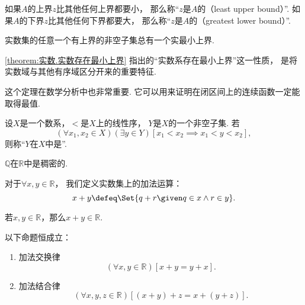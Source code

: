 如果\(A\)的上界\(z\)比其他任何上界都要小，
那么称“\(z\)是\(A\)的（least upper bound）”.
如果\(A\)的下界\(z\)比其他任何下界都要大，
那么称“\(z\)是\(A\)的（greatest lower bound）”.

\begin{theorem}\label{theorem:实数.实数存在最小上界}
实数集的任意一个有上界的非空子集总有一个实最小上界.
\end{theorem}
\cref{theorem:实数.实数存在最小上界}
指出的“实数系存在最小上界”这一性质，
是将实数域与其他有序域区分开来的重要特征.

这个定理在数学分析中也非常重要.
它可以用来证明在闭区间上的连续函数一定能取得最值.

\begin{definition}
设\(X\)是一个数系，\(<\)是\(X\)上的线性序，
\(Y\)是\(X\)的一个非空子集.
若\[
	(\forall x_1,x_2 \in X)
	(\exists y \in Y)
	[x_1 < x_2 \implies x_1 < y < x_2],
\]
则称“\(Y\)在\(X\)中是”.
\end{definition}

\begin{proposition}
\(\mathbb{Q}\)在\(\mathbb{R}\)中是稠密的.
\end{proposition}

\begin{definition}
对于\(\forall x,y\in\mathbb{R}\)，
我们定义实数集上的加法运算：
\begin{equation}
	x + y \defeq \Set{
		q + r \given q \in x \land r \in y
	}.
\end{equation}
\end{definition}

\begin{lemma}
若\(x,y\in\mathbb{R}\)，那么\(x+y\in\mathbb{R}\).
\end{lemma}

\begin{theorem}
以下命题恒成立：
\begin{enumerate}
	\item 加法交换律
	\begin{equation}
		(\forall x,y\in\mathbb{R})[x+y=y+x].
	\end{equation}
	\item 加法结合律
	\begin{equation}
		(\forall x,y,z\in\mathbb{R})[(x+y)+z=x+(y+z)].
	\end{equation}
\end{enumerate}
\end{theorem}

